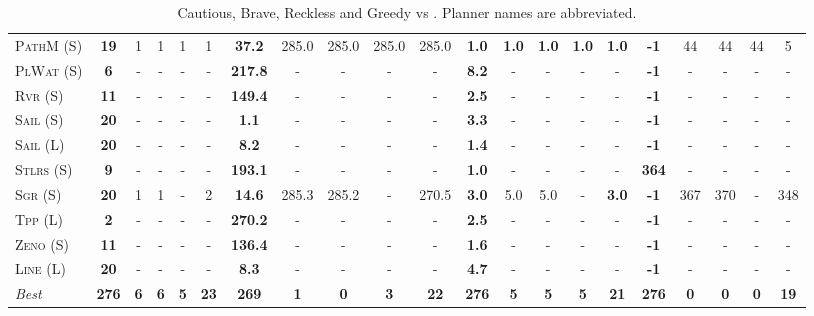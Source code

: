 \documentclass[11pt,landscape]{article}
\begin{document}
\begin{table}[tb]
{\begin{tabular}{|l||ccccc||ccccc||ccccc||ccccc||}
\textsc{PathM} (S)&\textbf{19}&1&1&1&1&\textbf{37.2}&285.0&285.0&285.0&285.0&\textbf{1.0}&\textbf{1.0}&\textbf{1.0}&\textbf{1.0}&\textbf{1.0}&\textbf{-1}&44&44&44&5\\
\textsc{PlWat} (S)&\textbf{6}&-&-&-&-&\textbf{217.8}&-&-&-&-&\textbf{8.2}&-&-&-&-&\textbf{-1}&-&-&-&-\\
\textsc{Rvr} (S)&\textbf{11}&-&-&-&-&\textbf{149.4}&-&-&-&-&\textbf{2.5}&-&-&-&-&\textbf{-1}&-&-&-&-\\
\textsc{Sail} (S)&\textbf{20}&-&-&-&-&\textbf{1.1}&-&-&-&-&\textbf{3.3}&-&-&-&-&\textbf{-1}&-&-&-&-\\
\textsc{Sail} (L)&\textbf{20}&-&-&-&-&\textbf{8.2}&-&-&-&-&\textbf{1.4}&-&-&-&-&\textbf{-1}&-&-&-&-\\
\textsc{Stlrs} (S)&\textbf{9}&-&-&-&-&\textbf{193.1}&-&-&-&-&\textbf{1.0}&-&-&-&-&\textbf{364}&-&-&-&-\\
\textsc{Sgr} (S)&\textbf{20}&1&1&-&2&\textbf{14.6}&285.3&285.2&-&270.5&\textbf{3.0}&5.0&5.0&-&\textbf{3.0}&\textbf{-1}&367&370&-&348\\
\textsc{Tpp} (L)&\textbf{2}&-&-&-&-&\textbf{270.2}&-&-&-&-&\textbf{2.5}&-&-&-&-&\textbf{-1}&-&-&-&-\\
\textsc{Zeno} (S)&\textbf{11}&-&-&-&-&\textbf{136.4}&-&-&-&-&\textbf{1.6}&-&-&-&-&\textbf{-1}&-&-&-&-\\
\textsc{Line} (L)&\textbf{20}&-&-&-&-&\textbf{8.3}&-&-&-&-&\textbf{4.7}&-&-&-&-&\textbf{-1}&-&-&-&-
\\\hline
\textit{Best}&\textbf{276}&\textbf{6}&\textbf{6}&\textbf{5}&\textbf{23}&\textbf{269}&\textbf{1}&\textbf{0}&\textbf{3}&\textbf{22}&\textbf{276}&\textbf{5}&\textbf{5}&\textbf{5}&\textbf{21}&\textbf{276}&\textbf{0}&\textbf{0}&\textbf{0}&\textbf{19}\\\hline

        \end{tabular}}
        \caption{Cautious, Brave, Reckless and Greedy \pattyd vs \pattyo. Planner names are abbreviated.}
        \label{tab:cbrg}
        \end{table}
        
\end{document}
